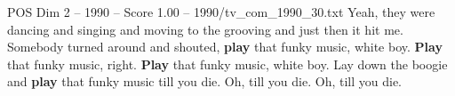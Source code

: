 \begin{textsample}{POS Dim 2 – 1990 – Score 1.00 – 1990/tv\_com\_1990\_30.txt}  \label{ex:f2_pos_039}
Yeah, they were dancing and singing and moving to the grooving and just then it hit me.
Somebody turned around and shouted, \textbf{play} that funky music, white boy. \textbf{Play} that funky music, right. \textbf{Play} that funky music, white boy.
Lay down the boogie and \textbf{play} that funky music till you die.
Oh, till you die.
Oh, till you die.

\end{textsample}
